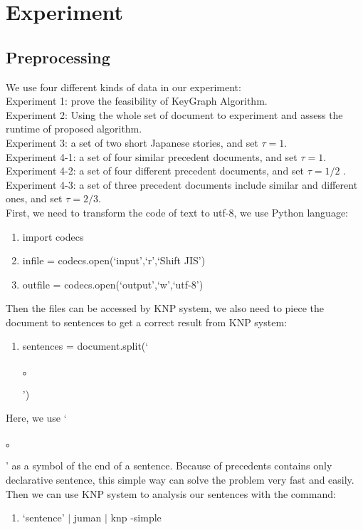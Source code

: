 \chapter{Experiment}
\section{Preprocessing}
We use four different kinds of data in our experiment:\\
Experiment 1: prove the feasibility of KeyGraph Algorithm.\\
Experiment 2: Using the whole set of document to experiment and assess the runtime of proposed algorithm.\\
Experiment 3: a set of two short Japanese stories, and set $\tau = 1$.\\
Experiment 4-1: a set of four similar precedent documents, and set $\tau = 1$.\\
Experiment 4-2: a set of four different precedent documents, and set $\tau = 1/2$ .\\
Experiment 4-3: a set of three precedent documents include similar and different ones, and set $\tau = 2/3$.\\
First, we need to transform the code of text to utf-8, we use Python language:\\
\begin{enumerate}[*]
\item import codecs
\item infile = codecs.open(`input',`r',`Shift JIS')
\item outfile = codecs.open(`output',`w',`utf-8')
\end{enumerate}
Then the files can be accessed by KNP system, we also need to piece the document to sentences to get a correct result from KNP system:\\
\begin{enumerate}[*]
\item sentences = document.split(`\begin{CJK}{UTF8}{ipxm}。\end{CJK}')
\end{enumerate}
Here, we use `\begin{CJK}{UTF8}{ipxm}。\end{CJK}' as a symbol of the end of a sentence. Because of precedents contains only declarative sentence, this simple way can solve the problem very fast and easily.
Then we can use KNP system to analysis our sentences with the command:\\
\begin{enumerate}[*]
\item `sentence' $|$ juman $|$ knp -simple
\end{enumerate}

